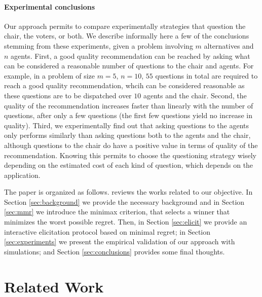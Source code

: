 \documentclass[sigconf, anonymous]{aamas}
\begin{document}
\paragraph{Experimental conclusions}
Our approach permits to compare experimentally strategies that question the chair, the voters, or both. We describe informally here a few of the conclusions stemming from these experiments, given a problem involving $m$ alternatives and $n$ agents. First, a good quality recommendation can be reached by asking what can be considered a reasonable number of questions to the chair and agents. For example, in a problem of size $m = 5$, $n = 10$, $55$ questions in total are required to reach a good quality recommendation, whcih can be considered reasonable as these questions are to be dispatched over $10$ agents and the chair.
Second, the quality of the recommendation increases faster than linearly with the number of questions, after only a few questions (the first few questions yield no increase in quality).
Third, we experimentally find out that asking questions to the agents only performs similarly than asking questions both to the agents and the chair, although questions to the chair do have a positive value in terms of quality of the recommendation.
Knowing this permits to choose the questioning strategy wisely depending on the estimated cost of each kind of question, which depends on the application. 

The paper is organized as follows.  reviews the works related to our objective.
In Section \ref{sec:background} we provide the necessary background and in Section \ref{sec:mmr} we introduce the minimax criterion, that selects a winner that minimizes the worst possible regret.
Then, in Section \ref{sec:elicit} we provide an interactive elicitation protocol based on minimal regret;  in Section \ref{sec:experiments} we present the empirical validation of our approach with simulations; and Section \ref{sec:conclusions} provides some final thoughts.

\section{Related Work}
\label{sec:related}
\end{document}
